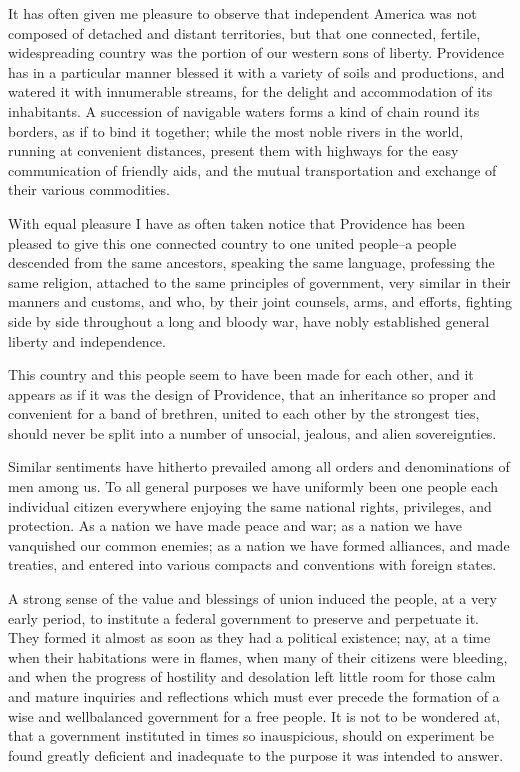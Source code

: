 It has often given me pleasure to observe that independent
America was not composed of detached and distant territories, but
that one connected, fertile, widespreading country was the portion
of our western sons of liberty. Providence has in a particular
manner blessed it with a variety of soils and productions, and
watered it with innumerable streams, for the delight and
accommodation of its inhabitants. A succession of navigable waters
forms a kind of chain round its borders, as if to bind it together;
while the most noble rivers in the world, running at convenient
distances, present them with highways for the easy communication of
friendly aids, and the mutual transportation and exchange of their
various commodities.

With equal pleasure I have as often taken notice that Providence
has been pleased to give this one connected country to one united
people--a people descended from the same ancestors, speaking the same
language, professing the same religion, attached to the same
principles of government, very similar in their manners and customs,
and who, by their joint counsels, arms, and efforts, fighting side
by side throughout a long and bloody war, have nobly established
general liberty and independence.

This country and this people seem to have been made for each
other, and it appears as if it was the design of Providence, that an
inheritance so proper and convenient for a band of brethren, united
to each other by the strongest ties, should never be split into a
number of unsocial, jealous, and alien sovereignties.

Similar sentiments have hitherto prevailed among all orders and
denominations of men among us. To all general purposes we have
uniformly been one people each individual citizen everywhere
enjoying the same national rights, privileges, and protection. As a
nation we have made peace and war; as a nation we have vanquished
our common enemies; as a nation we have formed alliances, and made
treaties, and entered into various compacts and conventions with
foreign states.

A strong sense of the value and blessings of union induced the
people, at a very early period, to institute a federal government to
preserve and perpetuate it. They formed it almost as soon as they
had a political existence; nay, at a time when their habitations
were in flames, when many of their citizens were bleeding, and when
the progress of hostility and desolation left little room for those
calm and mature inquiries and reflections which must ever precede
the formation of a wise and wellbalanced government for a free
people. It is not to be wondered at, that a government instituted
in times so inauspicious, should on experiment be found greatly
deficient and inadequate to the purpose it was intended to answer.

